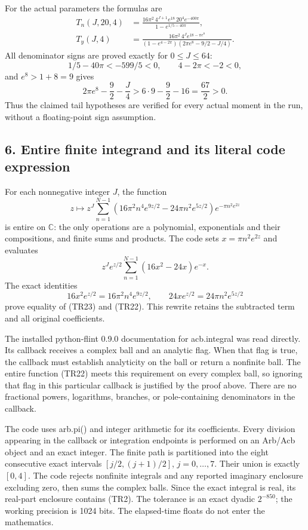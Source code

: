 For the actual parameters the formulas are \[
 \begin{aligned}
 T_n(J,20,4)&=
 \frac{16\pi^2\,4^{J+1}e^{18}\,20^4e^{-400\pi}}
 {1-e^{1/5-40\pi}},\\
 T_y(J,4)&=
 \frac{16\pi^2\,4^Je^{18-\pi e^8}}
 {(1-e^{4-2\pi})(2\pi e^8-9/2-J/4)}.
 \end{aligned}
 \tag{TR19}
\] All denominator signs are proved exactly for \(0\leq J\leq64\): \[
 1/5-40\pi<-599/5<0,\qquad4-2\pi<-2<0,
 \tag{TR20}
\] and \(e^8>1+8=9\) gives \[
 2\pi e^8-\frac92-\frac J4
 >6\cdot9-\frac92-16=\frac{67}{2}>0.
 \tag{TR21}
\] Thus the claimed tail hypotheses are verified for every actual moment in the run, without a floating-point sign assumption.

\subsection{6. Entire finite integrand and its literal code expression}\label{entire-finite-integrand-and-its-literal-code-expression}

For each nonnegative integer \(J\), the function \[
 z\longmapsto z^J\sum_{n=1}^{N-1}
 (16\pi^2n^4e^{9z/2}-24\pi n^2e^{5z/2})
 e^{-\pi n^2e^{2z}}
 \tag{TR22}
\] is entire on \(\mathbb C\): the only operations are a polynomial, exponentials and their compositions, and finite sums and products. The code sets \(x=\pi n^2e^{2z}\) and evaluates \[
 z^Je^{z/2}\sum_{n=1}^{N-1}(16x^2-24x)e^{-x}.
 \tag{TR23}
\] The exact identities \[
 16x^2e^{z/2}=16\pi^2n^4e^{9z/2},
 \qquad24xe^{z/2}=24\pi n^2e^{5z/2}
 \tag{TR24}
\] prove equality of (TR23) and (TR22). This rewrite retains the subtracted term and all original coefficients.

The installed python-flint 0.9.0 documentation for acb.integral was read directly. Its callback receives a complex ball and an analytic flag. When that flag is true, the callback must establish analyticity on the ball or return a nonfinite ball. The entire function (TR22) meets this requirement on every complex ball, so ignoring that flag in this particular callback is justified by the proof above. There are no fractional powers, logarithms, branches, or pole-containing denominators in the callback.

The code uses arb.pi() and integer arithmetic for its coefficients. Every division appearing in the callback or integration endpoints is performed on an Arb/Acb object and an exact integer. The finite path is partitioned into the eight consecutive exact intervals \([j/2,(j+1)/2]\), \(j=0,\ldots,7\). Their union is exactly \([0,4]\). The code rejects nonfinite integrals and any reported imaginary enclosure excluding zero, then sums the complex balls. Since the exact integral is real, its real-part enclosure contains (TR2). The tolerance is an exact dyadic \(2^{-850}\); the working precision is 1024 bits. The elapsed-time floats do not enter the mathematics.

